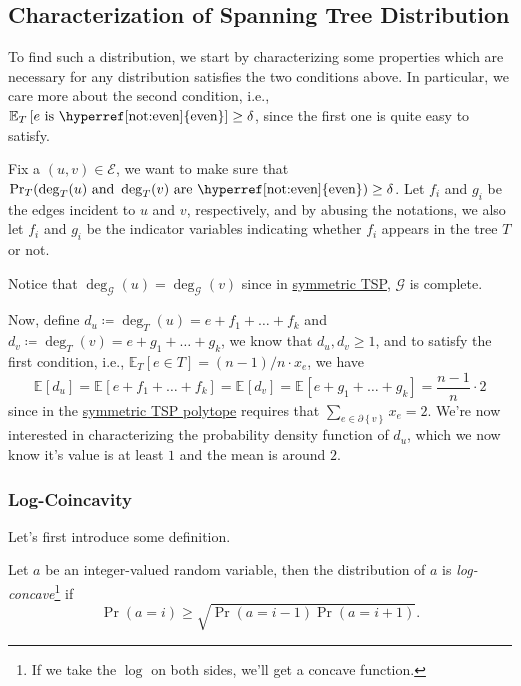 \subsection{Characterization of Spanning Tree Distribution}
To find such a distribution, we start by characterizing some properties which are necessary for any distribution satisfies the two conditions above. In particular, we care more about the second condition, i.e., \(\mathbb{E}_{T}\left[e \text{ is \hyperref[not:even]{even}} \right] \geq \delta \), since the first one is quite easy to satisfy.

Fix a \((u, v)\in \mathcal{E} \), we want to make sure that \(\Pr_T(\deg_T(u)\text{ and }\deg_T(v)\text{ are \hyperref[not:even]{even}}) \geq \delta \). Let \(f_i\) and \(g_i\) be the edges incident to \(u\) and \(v\), respectively, and by abusing the notations, we also let \(f_i\) and \(g_i\) be the indicator variables indicating whether \(f_i\) appears in the tree \(T\) or not.
\begin{center}
\end{center}

\begin{note}
	Notice that \(\deg_{\mathcal{G} }(u) = \deg_{\mathcal{G} }(v)\) since in \hyperref[prb:STSP]{symmetric TSP}, \(\mathcal{G} \) is complete.
\end{note}

Now, define \(d_u \coloneqq \deg_{T}(u) = e + f_1 + \ldots  + f_k\) and \(d_v \coloneqq \deg_T(v) = e + g_1 + \ldots  + g_k\), we know that \(d_u, d_v \geq 1\), and to satisfy the first condition, i.e., \(\mathbb{E}_{T}\left[e\in T \right] = (n-1) / n \cdot x_e\), we have
\[
	\mathbb{E}_{}\left[d_u \right] = \mathbb{E}_{}\left[e + f_1 + \ldots + f_k  \right] = \mathbb{E}_{}\left[d_v \right] = \mathbb{E}_{}\left[e + g_1 + \ldots + g_k  \right] = \frac{n-1}{n}\cdot 2
\]
since in the \hyperref[eq:STSP-polytope]{symmetric TSP polytope} requires that \(\sum_{e\in \partial \left\{ v \right\}} x_e = 2\). We're now interested in characterizing the probability density function of \(d_u\), which we now know it's value is at least \(1\) and the mean is around \(2\).

\subsubsection{Log-Coincavity}\label{subsub:log-concavity}
Let's first introduce some definition.

\begin{definition}\label{def:log-concave}
	Let \(a\) be an integer-valued random variable, then the distribution of \(a\) is \emph{log-concave}\footnote{If we take the \(\log\) on both sides, we'll get a concave function.} if
	\[
		\Pr(a=i) \geq \sqrt{\Pr(a=i-1) \Pr(a=i+1)}.
	\]
\end{definition}

